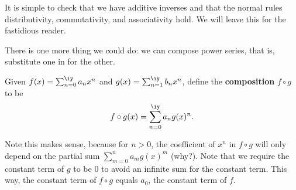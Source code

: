 It is simple to check that we have additive inverses and that the normal rules distributivity, commutativity, and associativity hold. We will leave this for the fastidious reader.

There is one more thing we could do: we can compose power series, that is, substitute one in for the other.
\begin{df}
Given $f(x)=\sum_{n=0}^{\iy} a_n x^n$ and $g(x)=\sum_{n=1}^{\iy} b_n x^n$, define the \textbf{composition} $f\circ g$ to be
\[
f\circ g(x)=\sum_{n=0}^{\iy}a_n g(x)^n.
\]
\end{df}
Note this makes sense, because for $n>0$, the coefficient of $x^n$ in $f\circ g$ will only depend on the partial sum $\sum_{m=0}^{n} a_mg(x)^m$ (why?). Note that we require the constant term of $g$ to be 0 to avoid an infinite sum for the constant term. This way, the constant term of $f\circ g$ equals $a_0$, the constant term of $f$.
